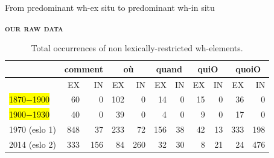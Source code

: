 \documentclass[lesson_slides]{subfiles}
\begin{document}
\begin{frame}[c]{From predominant wh-ex situ to predominant wh-in situ}

\textbf{\textsc{our raw data}}

\begin{table}[H]
    \centering
    \small
    \begin{adjustbox}
        \begin{tabular}{l|rr|rr|rr|rr|rr}
        {} & \multicolumn{2}{c}{comment}  & \multicolumn{2}{c}{où} & \multicolumn{2}{c}{quand} & \multicolumn{2}{c}{quiO}& \multicolumn{2}{c}{quoiO}\\
        \hline
        {} & EX & IN & EX & IN & EX & IN & EX & IN & EX & IN\\
        \hl{1870$-$1900} & 60 & 0 & 102 & 0 & 14 & 0 & 15 & 0 & 36 & 0\\
        \hl{1900$-$1930} & 40 & 0 & 39 & 0 & 4 & 0 & 9 & 0 & 17 & 0\\
        1970 (eslo 1) & 848 & 37 & 233 & 72 & 156 & 38 & 42 & 13 & 333 & 198\\
        2014 (eslo 2) & 333 & 156 & 84 & 260 & 32 & 30 & 8 & 21 & 24 & 476 \\
        \hline
        \end{tabular}
    \end{adjustbox}
\caption{\label{tab:samp3}Total occurrences of non lexically-restricted wh-elements.}
\end{table}
  
\end{frame}
\end{document}
